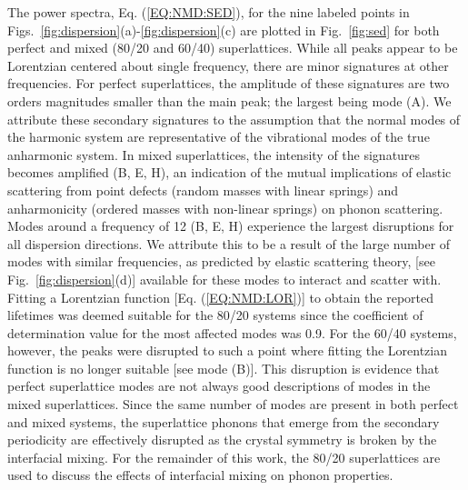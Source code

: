 \documentclass[aps,prb,preprint,preprintnumbers,amsmath,amssymb,floatfix,superscriptaddress]{revtex4}
\begin{document}
The power spectra, Eq. (\ref{EQ:NMD:SED}), for the nine labeled points in Figs.~\ref{fig:dispersion}(a)-\ref{fig:dispersion}(c) are plotted in Fig.~\ref{fig:sed} for both perfect and mixed (80/20 and 60/40) superlattices. While all peaks appear to be Lorentzian centered about single frequency, there are minor signatures at other frequencies. For perfect superlattices, the amplitude of these signatures are two orders magnitudes smaller than the main peak; the largest being mode (A). We attribute these secondary signatures to the assumption that the normal modes of the harmonic system are representative of the vibrational modes of the true anharmonic system. In mixed superlattices, the intensity of the signatures becomes amplified (B, E, H), an indication of the mutual implications of elastic scattering from point defects (random masses with linear springs) and anharmonicity (ordered masses with non-linear springs) on phonon scattering. \cite{RevModPhys.53.175}  Modes around a frequency of 12 (B, E, H) experience the largest disruptions for all dispersion directions. We attribute this to be a result of the large number of modes with similar frequencies, as predicted by elastic scattering theory, [see Fig.~\ref{fig:dispersion}(d)] available for these modes to interact and scatter with.\cite{tamura_isotope_1983} Fitting a Lorentzian function [Eq. (\ref{EQ:NMD:LOR})] to obtain the reported lifetimes was deemed suitable for the 80/20 systems since the coefficient of determination value \cite{Cowpe20081066} for the most affected modes was 0.9. For the 60/40 systems, however, the peaks were disrupted to such a point where fitting the Lorentzian function is no longer suitable [see mode (B)]. This disruption is evidence that perfect superlattice modes are not always good descriptions of modes in the mixed superlattices. Since the same number of modes are present in both perfect and mixed systems, the superlattice phonons that emerge from the secondary periodicity are effectively disrupted as the crystal symmetry is broken by the interfacial mixing. For the remainder of this work, the 80/20 superlattices are used to discuss the effects of interfacial mixing on phonon properties.
\end{document}
